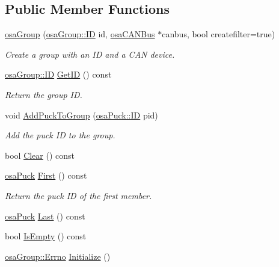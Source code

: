 \subsection*{Public Member Functions}
\begin{DoxyCompactItemize}
\item 
\hyperlink{classosa_group_a625dc997d81d164cdb1a1069cd3e35af}{osa\-Group} (\hyperlink{classosa_group_a642da327f9e3c40d46293432b949f199}{osa\-Group\-::\-I\-D} id, \hyperlink{classosa_c_a_n_bus}{osa\-C\-A\-N\-Bus} $\ast$canbus, bool createfilter=true)
\begin{DoxyCompactList}\small\item\em Create a group with an I\-D and a C\-A\-N device. \end{DoxyCompactList}\item 
\hyperlink{classosa_group_a642da327f9e3c40d46293432b949f199}{osa\-Group\-::\-I\-D} \hyperlink{classosa_group_a2f66e224affed939860f323d5a37145a}{Get\-I\-D} () const 
\begin{DoxyCompactList}\small\item\em Return the group I\-D. \end{DoxyCompactList}\item 
void \hyperlink{classosa_group_af9d9add8260af2a3358559680f369300}{Add\-Puck\-To\-Group} (\hyperlink{classosa_puck_aa484456bae759574accdc76fe68b4685}{osa\-Puck\-::\-I\-D} pid)
\begin{DoxyCompactList}\small\item\em Add the puck I\-D to the group. \end{DoxyCompactList}\item 
bool \hyperlink{classosa_group_af0aebeae4a7bee384ef5b46752c5f097}{Clear} () const 
\item 
\hyperlink{classosa_puck}{osa\-Puck} \hyperlink{classosa_group_aaf13608ea9c6e64013e4e3d26d364004}{First} () const 
\begin{DoxyCompactList}\small\item\em Return the puck I\-D of the first member. \end{DoxyCompactList}\item 
\hyperlink{classosa_puck}{osa\-Puck} \hyperlink{classosa_group_ae2ea8dea45cfdc5695f93ef6fa7a8848}{Last} () const 
\item 
bool \hyperlink{classosa_group_a2e1bb4b5a64dff04ce939c76adf63038}{Is\-Empty} () const 
\item 
\hyperlink{classosa_group_a3ac590c39198a7533838db29b01b994f}{osa\-Group\-::\-Errno} \hyperlink{classosa_group_a290e66f56d5657b137837ce7e23b1667}{Initialize} ()

\end{DoxyCompactItemize}
